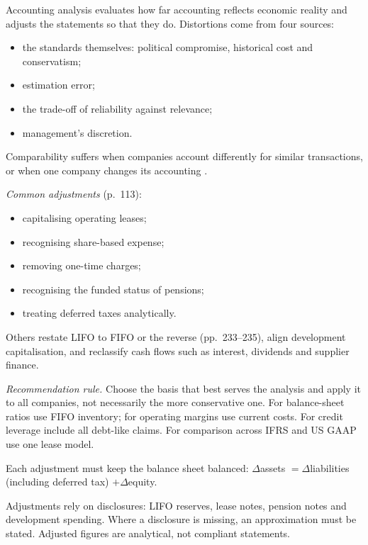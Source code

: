 \begin{qfmethod}\label{meth:accounting-analysis-adjustments}
 Accounting analysis evaluates how far accounting reflects economic reality and adjusts the statements so that they do. Distortions come from four sources:
\begin{itemize}
\item the standards themselves: political compromise, historical cost and conservatism;
\item estimation error;
\item the trade-off of reliability against relevance;
\item management's discretion.
\end{itemize}
Comparability suffers when companies account differently for similar transactions, or when one company changes its accounting \citep[pp.~12--13 and~106--108]{financial-statement-analysis-2009}.

\emph{Common adjustments} (p.~113):
\begin{itemize}
\item capitalising operating leases;
\item recognising share-based expense;
\item removing one-time charges;
\item recognising the funded status of pensions;
\item treating deferred taxes analytically.
\end{itemize}
Others restate LIFO to FIFO or the reverse (pp.~233--235), align development capitalisation, and reclassify cash flows such as interest, dividends and supplier finance.

\emph{Recommendation rule.} Choose the basis that best serves the analysis and apply it to all companies, not necessarily the more conservative one. For balance-sheet ratios use FIFO inventory; for operating margins use current costs. For credit leverage include all debt-like claims. For comparison across IFRS and US GAAP use one lease model.

 Each adjustment must keep the balance sheet balanced: $\Delta$assets $=\Delta$liabilities (including deferred tax) $+\Delta$equity.

 Adjustments rely on disclosures: LIFO reserves, lease notes, pension notes and development spending. Where a disclosure is missing, an approximation must be stated. Adjusted figures are analytical, not compliant statements.


\end{qfmethod}
